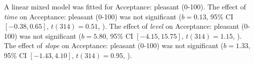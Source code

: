 A linear mixed model was fitted for Acceptance: pleasant (0-100).
The effect of \textit{time} on Acceptance: pleasant (0-100) was not significant ($b = 0.13$, 95\% CI $[-0.38, 0.65]$, $t(314) = 0.51$, ).
The effect of \textit{level} on Acceptance: pleasant (0-100) was not significant ($b = 5.80$, 95\% CI $[-4.15, 15.75]$, $t(314) = 1.15$, ).
The effect of \textit{slope} on Acceptance: pleasant (0-100) was not significant ($b = 1.33$, 95\% CI $[-1.43, 4.10]$, $t(314) = 0.95$, ).
